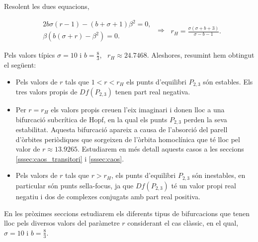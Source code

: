 \documentclass[11pt,a4paper,openright,oneside]{article}
\numberwithin{equation}{section}
\theoremstyle{definition}
\begin{document}
\begin{enumerate}
\begin{itemize}
\begin{itemize}
\begin{itemize}
                Resolent les dues equacions, 
         
                \begin{equation*}\begin{aligned}
                    &2b\sigma(r-1)-(b + \sigma +1)\beta^{2}=0,\\
                    &\beta\left(b(\sigma+r)-\beta^{2}\right)=0.
                \end{aligned}\ \Longrightarrow \
                \begin{aligned}
                    r_H=\frac{\sigma(\sigma +b+3)}{\sigma -b-1}.
                \end{aligned} \end{equation*}
    
                Pels valors típics $\sigma=10$ i $b=\frac{8}{3}$, \ $r_H\approx24.7468$. Aleshores, resumint hem obtingut el següent: 
    
                \begin{itemize}
                    \item Pels valors de $r$ tals que $1<r<r_H$ els punts d'equilibri $P_{2,3}$ són estables. Els tres valors propis de $Df\left(P_{2,3}\right)$ tenen part real negativa. 
        
                    \item Per $r=r_H$ els valors propis creuen l'eix imaginari i donen lloc a una bifurcació subcrítica de Hopf, en la qual els punts $P_{2,3}$ perden la seva estabilitat. Aquesta bifurcació apareix a causa de l'absorció del parell d'òrbites periòdiques que sorgeixen de l'òrbita homoclínica que té lloc pel valor de $r\approx13.9265$. Estudiarem en més detall aquests casos a les seccions \ref{sssec:caos_transitori} i \ref{sssec:caos}.
        
                    \item Pels valors de $r$ tals que $r>r_H$, els punts d'equilibri $P_{2,3}$ són inestables, en particular són punts sella-focus, ja que $Df\left(P_{2,3}\right)$ té un valor propi real negatiu i dos de complexes conjugats amb part real positiva.
                \end{itemize}
            \end{itemize}
        \end{itemize}
    \end{itemize}
\end{enumerate}

En les pròximes seccions estudiarem els diferents tipus de bifurcacions que tenen lloc pels diversos valors del paràmetre $r$ considerant el cas clàssic, en el qual, $\sigma=10$ i $b=\frac{8}{3}$.
\end{document}
